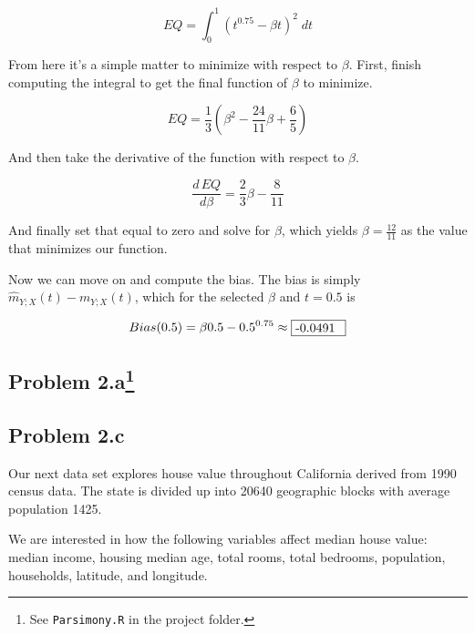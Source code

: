 \documentclass[letter]{article}
\newcounter{foot}
\begin{document}
\begin{equation}
	EQ = \int _0 ^1 (t^{0.75} - \beta t)^2 \; dt
\end{equation}

From here it's a simple matter to minimize with respect to $\beta$. First, finish computing the integral to get the final function of $\beta$ to minimize.

\begin{equation}
	EQ = \frac{1}{3}(\beta^2 - \frac{24}{11}\beta + \frac{6}{5})
\end{equation}

And then take the derivative of the function with respect to $\beta$.

\begin{equation}
	\frac{d\,EQ}{d\beta} = \frac{2}{3}\beta - \frac{8}{11}
\end{equation}

And finally set that equal to zero and solve for $\beta$, which yields $\beta=\frac{12}{11}$ as the value that minimizes our function.

Now we can move on and compute the bias. The bias is simply $\hat{m}_{Y;X}(t) - m_{Y;X}(t)$, which for the selected $\beta$ and $t=0.5$ is

\begin{equation}
	Bias(0.5) = \beta 0.5 - 0.5^{0.75} \approx {\fbox {\parbox{0.5in}{-0.0491}}}
\end{equation}


\subsection*{Problem 2.a\footnote{See \texttt{Parsimony.R} in the project folder.}}






%


\subsection*{Problem 2.c}
Our next data set explores house value throughout California derived from 1990 census data. The state is divided up into 20640 geographic blocks with average population 1425.

We are interested in how the following variables affect median house value: median income, housing median age, total rooms, total bedrooms, population, households, latitude, and longitude.
\end{document}
